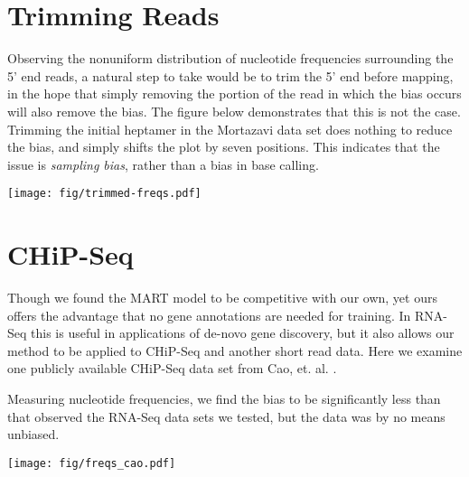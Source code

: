 \documentclass[letterpaper]{article}
\begin{document}




\section{Trimming Reads}

Observing the nonuniform distribution of nucleotide frequencies surrounding the
5' end reads, a natural step to take would be to trim the 5' end before mapping,
in the hope that simply removing the portion of the read in which the bias
occurs will also remove the bias. The figure below demonstrates that this is not
the case. Trimming the initial heptamer in the Mortazavi data set does nothing to
reduce the bias, and simply shifts the plot by seven positions. This indicates
that the issue is \emph{sampling bias}, rather than a bias in base calling.


\begin{center}
\texttt{[image: fig/trimmed-freqs.pdf]}
\end{center}


\section{CHiP-Seq}

Though we found the MART model \cite{Li2010} to be competitive with our own,
yet ours offers the advantage that no gene annotations are needed for training. In
RNA-Seq this is useful in applications of de-novo gene discovery, but it also
allows our method to be applied to CHiP-Seq and another short read data. Here we
examine one publicly available CHiP-Seq data set from Cao, et. al.
\cite{Cao2010}.  

Measuring nucleotide frequencies, we find the bias to be significantly less
than that observed the RNA-Seq data sets we tested, but the data was by no means
unbiased.

\begin{center}
\texttt{[image: fig/freqs\_cao.pdf]}
\end{center}
\end{document}
